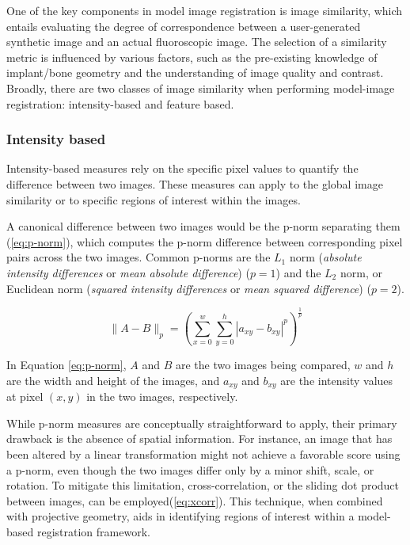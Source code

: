 One of the key components in model image registration is image similarity, which entails evaluating the degree of correspondence between a user-generated synthetic image and an actual fluoroscopic image.
The selection of a similarity metric is influenced by various factors, such as the pre-existing knowledge of implant/bone geometry and the understanding of image quality and contrast.
Broadly, there are two classes of image similarity when performing model-image registration: intensity-based and feature based.

\subsubsection{Intensity based}
\label{sec:img-sim-intensity}
Intensity-based measures rely on the specific pixel values to quantify the difference between two images.
These measures can apply to the global image similarity or to specific regions of interest within the images.

A canonical difference between two images would be the p-norm separating them (\cref{eq:p-norm}), which computes the p-norm difference between corresponding pixel pairs across the two images.
Common p-norms are the $L_1$ norm (\emph{absolute intensity differences} or \emph{mean absolute difference}) \cite{kanadeStereoMatchingAlgorithm1994} ($p=1$) and the $L_{2}$ norm, or Euclidean norm (\emph{squared intensity differences} or \emph{mean squared difference}) \cite{hannahComputerMatchingAreas1977}($p=2$).

\begin{equation}
    \|A-B\|_{p} = (\sum_{x=0}^{w}\sum_{y=0}^{h}|a_{xy}-b_{xy}|^{p})^{\frac{1}{p}}
    \label{eq:p-norm}
\end{equation}

In Equation \cref{eq:p-norm}, $A$ and $B$ are the two images being compared, $w$ and $h$ are the width and height of the images, and $a_{xy}$ and $b_{xy}$ are the intensity values at pixel $(x,y)$ in the two images, respectively.

While p-norm measures are conceptually straightforward to apply, their primary drawback is the absence of spatial information.
For instance, an image that has been altered by a linear transformation might not achieve a favorable score using a p-norm, even though the two images differ only by a minor shift, scale, or rotation.
To mitigate this limitation, cross-correlation, or the sliding dot product between images, can be employed​​​ \cite{bendatRandomDataAnalysis2010,hannahComputerMatchingAreas1977} (\cref{eq:xcorr}).
This technique, when combined with projective geometry, aids in identifying regions of interest within a model-based registration framework.

